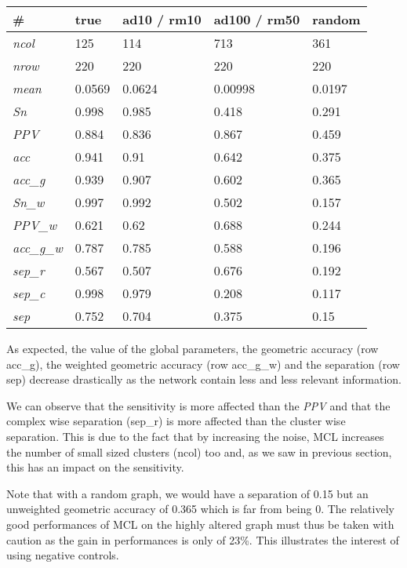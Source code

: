 \begin{tabular}{|l|l|l|l|l|}
\hline
\# & \textbf{true }& \textbf{ad10 / rm10} & \textbf{ad100 / rm50} & \textbf{random} \\ \hline
\textit{ncol} & 125 & 114 & 713 & 361 \\ \hline
\textit{nrow} & 220 & 220 & 220 & 220 \\ \hline
\textit{mean} & 0.0569 & 0.0624 & 0.00998 & 0.0197 \\ \hline
\textit{Sn} & 0.998 & 0.985 & 0.418 & 0.291 \\ \hline
\textit{PPV} & 0.884 & 0.836 & 0.867 & 0.459 \\ \hline
\textit{acc} & 0.941 & 0.91 & 0.642 & 0.375 \\ \hline
\textit{acc\_g} & 0.939 & 0.907 & 0.602 & 0.365 \\ \hline
\textit{Sn\_w} & 0.997 & 0.992 & 0.502 & 0.157 \\ \hline
\textit{PPV\_w} & 0.621 & 0.62 & 0.688 & 0.244 \\ \hline
\textit{acc\_g\_w} & 0.787 & 0.785 & 0.588 & 0.196 \\ \hline
\textit{sep\_r} & 0.567 & 0.507 & 0.676 & 0.192 \\ \hline
\textit{sep\_c} & 0.998 & 0.979 & 0.208 & 0.117 \\ \hline
\textit{sep} & 0.752 & 0.704 & 0.375 & 0.15 \\ \hline
\end{tabular}


As expected, the value of the global parameters, the geometric accuracy (row acc\_g), the weighted geometric accuracy (row acc\_g\_w) and the separation (row sep) decrease drastically as the network contain less and less relevant information.

We can observe that the sensitivity is more affected than the \textit{PPV} and that the complex wise separation (sep\_r) is more affected than the cluster wise separation. This is due to the fact that by increasing the noise, MCL increases the number of small sized clusters (ncol) too and, as we saw in previous section, this has an impact on the sensitivity.

Note that with a random graph, we would have a separation of 0.15 but an unweighted geometric accuracy of 0.365 which is far from being 0. The relatively good performances of MCL on the highly altered graph must thus be taken with caution as the gain in performances is only of 23\%. This illustrates the interest of using negative controls.